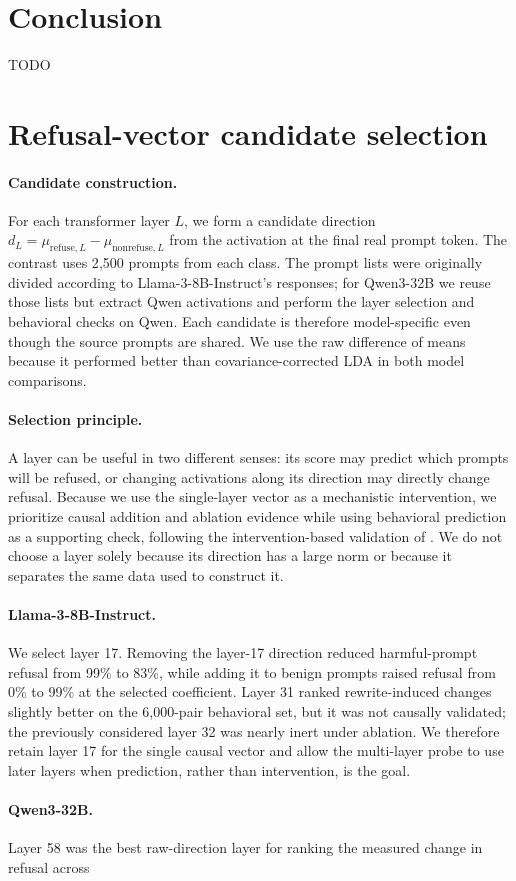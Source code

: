 \documentclass{article}
\begin{document}
\section{Conclusion}

TODO


\appendix\section{Refusal-vector candidate selection} \label{app:refusal-vector-selection} \paragraph{Candidate construction.} For each transformer layer \(L\), we form a candidate direction \(d_L=\mu_{\mathrm{refuse},L}-\mu_{\mathrm{nonrefuse},L}\) from the activation at the final real prompt token. The contrast uses 2{,}500 prompts from each class. The prompt lists were originally divided according to Llama-3-8B-Instruct's responses; for Qwen3-32B we reuse those lists but extract Qwen activations and perform the layer selection and behavioral checks on Qwen. Each candidate is therefore model-specific even though the source prompts are shared. We use the raw difference of means because it performed better than covariance-corrected LDA in both model comparisons. \paragraph{Selection principle.} A layer can be useful in two different senses: its score may predict which prompts will be refused, or changing activations along its direction may directly change refusal. Because we use the single-layer vector as a mechanistic intervention, we prioritize causal addition and ablation evidence while using behavioral prediction as a supporting check, following the intervention-based validation of \citet{arditi2024refusal}. We do not choose a layer solely because its direction has a large norm or because it separates the same data used to construct it. \paragraph{Llama-3-8B-Instruct.} We select layer 17. Removing the layer-17 direction reduced harmful-prompt refusal from 99\% to 83\%, while adding it to benign prompts raised refusal from 0\% to 99\% at the selected coefficient. Layer 31 ranked rewrite-induced changes slightly better on the 6{,}000-pair behavioral set, but it was not causally validated; the previously considered layer 32 was nearly inert under ablation. We therefore retain layer 17 for the single causal vector and allow the multi-layer probe to use later layers when prediction, rather than intervention, is the goal. \paragraph{Qwen3-32B.} Layer 58 was the best raw-direction layer for ranking the measured change in refusal across 
\end{document}
